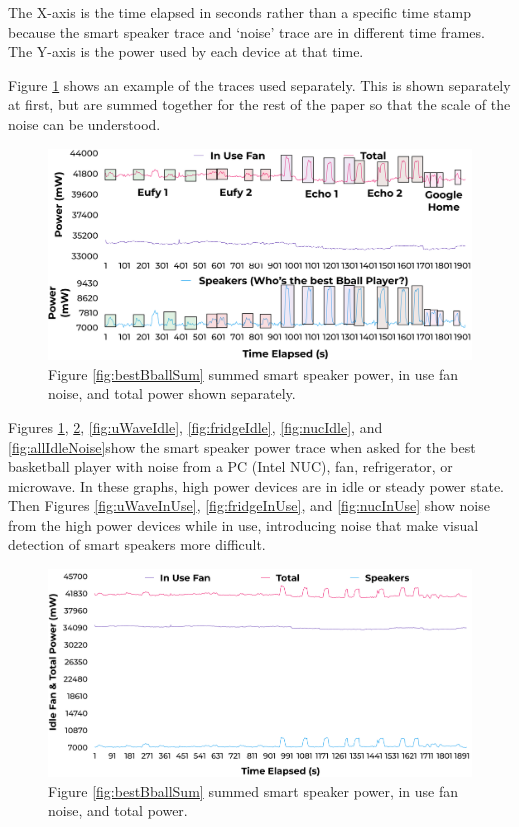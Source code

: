 The X-axis is the time elapsed in seconds rather than a specific time stamp because the smart speaker trace and `noise' trace are in different time frames. The Y-axis is the power used by each device at that time.

Figure \ref{fig:fanIdleSeperate} shows an example of the traces used separately. This is shown separately at first, but are summed together for the rest of the paper so that the scale of the noise can be understood.

\begin{figure}[H]
  \centering
  \includegraphics[width=1\textwidth]{figures/inUseFanNoiseSeperate.png}
  \caption{Figure \ref{fig:bestBballSum} summed smart speaker power, in use fan noise, and total power shown separately.}
  \label{fig:fanIdleSeperate}
\end{figure}

Figures \ref{fig:fanIdleSeperate}, \ref{fig:fanIdle}, \ref{fig:uWaveIdle}, \ref{fig:fridgeIdle}, \ref{fig:nucIdle}, and \ref{fig:allIdleNoise}show the smart speaker power trace when asked for the best basketball player with noise from a PC (Intel NUC), fan, refrigerator, or microwave. In these graphs, high power devices are in idle or steady power state. Then Figures \ref{fig:uWaveInUse}, \ref{fig:fridgeInUse}, and \ref{fig:nucInUse} show noise from the high power devices while in use, introducing noise that make visual detection of smart speakers more difficult.

\begin{figure}[H]
  \centering
  \includegraphics[width=1\textwidth]{figures/inUseFanNoise.png}
  \caption{Figure \ref{fig:bestBballSum} summed smart speaker power, in use fan noise, and total power.}
  \label{fig:fanIdle}
\end{figure}

